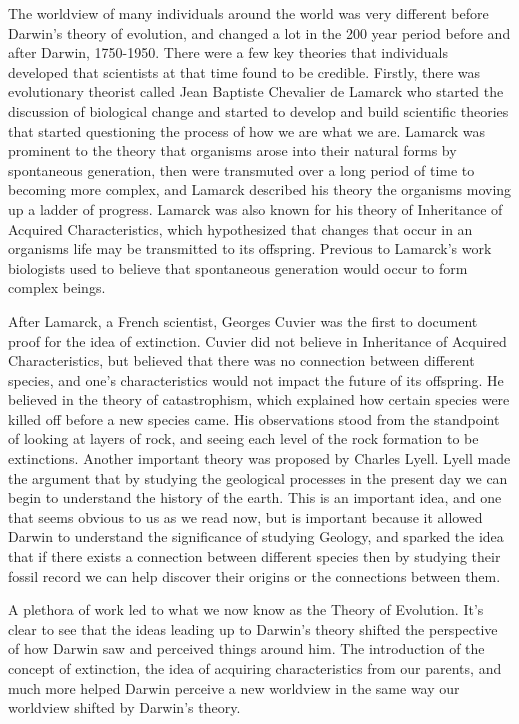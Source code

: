\documentclass[11pt, oneside]{article}
\begin{document}
\par The worldview of many individuals around the world was very different before Darwin's theory of evolution, and changed a lot in the 200 year period before and after Darwin, 1750-1950. There were a few key theories that individuals developed that scientists at that time found to be credible. Firstly, there was evolutionary theorist called Jean Baptiste Chevalier de Lamarck who started the discussion of biological change and started to develop and build scientific theories that started questioning the process of how we are what we are. Lamarck was prominent to the theory that organisms arose into their natural forms by spontaneous generation, then were transmuted over a long period of time to becoming more complex, and Lamarck described his theory the organisms moving up a ladder of progress. Lamarck was also known for his theory of Inheritance of Acquired Characteristics, which hypothesized that changes that occur in an organisms life may be transmitted to its offspring. Previous to Lamarck's work biologists used to believe that spontaneous generation would occur to form complex beings. 

\par After Lamarck, a French scientist, Georges Cuvier was the first to document proof for the idea of extinction. Cuvier did not believe in Inheritance of Acquired Characteristics, but believed that there was no connection between different species, and one's characteristics would not impact the future of its offspring. He believed in the theory of catastrophism, which explained how certain species were killed off before a new species came. His observations stood from the standpoint of looking at layers of rock, and seeing each level of the rock formation to be extinctions. Another important theory was proposed by Charles Lyell. Lyell made the argument that by studying the geological processes in the present day we can begin to understand the history of the earth. This is an important idea, and one that seems obvious to us as we read now, but is  important because it allowed Darwin to understand the significance of studying Geology, and sparked the idea that if there exists a connection between different species then by studying their fossil record we can help discover their origins or the connections between them. 

\par A plethora of work led to what we now know as the Theory of Evolution. It's clear to see that the ideas leading up to Darwin's theory shifted the perspective of how Darwin saw and perceived things around him. The introduction of the concept of extinction, the idea of acquiring characteristics from our parents, and much more helped Darwin perceive a new worldview in the same way our worldview shifted by Darwin's theory. 
\end{document}
